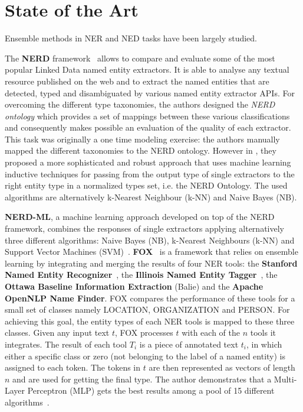 \documentclass{llncs}
\begin{document}

\section{State of the Art}
\label{sec:state-of-art}
Ensemble methods in NER and NED tasks have been largely studied.

The \textbf{NERD} framework~\cite{nerd1,nerd2} allows to compare and evaluate some of the most popular Linked Data named entity extractors.
It is able to analyse any textual resource published on the web and to extract the named entities that are detected, typed and disambiguated by various named entity extractor APIs. For overcoming the different type taxonomies, the authors designed the \textit{NERD ontology} which provides a set of mappings between these various classifications and consequently makes possible an evaluation of the quality of each extractor. This task was originally a one time modeling exercise: the authors manually mapped the different taxonomies to the NERD ontology.
However in \cite{nerd4}, they proposed a more sophisticated and robust approach that uses machine learning inductive techniques for passing from the output type of single extractors to the right entity type in a normalized types set, i.e. the NERD Ontology. The used algorithms are alternatively k-Nearest Neighbour (k-NN) and Naive Bayes (NB).

\textbf{NERD-ML}, a machine learning approach developed on top of the NERD framework, combines the responses of single extractors applying alternatively three different  algorithms: Naive Bayes (NB), k-Nearest Neighbours (k-NN) and Support Vector Machines (SVM)~\cite{nerd2,nerd3}. \textbf{FOX}~\cite{fox1,fox2} is a framework that relies on ensemble learning by integrating and merging the results of four NER tools: the \textbf{Stanford Named Entity Recognizer}~\cite{Finkel:2005:INI:1219840.1219885},
the \textbf{Illinois Named Entity Tagger}~\cite{Ratinov:2009:DCM:1596374.1596399},
the \textbf{Ottawa Baseline Information Extraction} (Balie) and the \textbf{Apache OpenNLP Name Finder}. FOX compares the performance of these tools for a small set of classes namely LOCATION, ORGANIZATION and PERSON. For achieving this goal, the entity types of each NER tools is mapped to these three classes. Given any input text $t$, FOX processes $t$ with each of the $n$ tools it integrates. The result of each tool $T_i$ is a piece of annotated text $t_i$, in which either a specific class or zero (not belonging to the label of a named entity) is assigned to each token. The tokens in $t$ are then represented as vectors of length $n$ and are used for getting the final type. The author demonstrates that a Multi-Layer Perceptron (MLP) gets the best results among a pool of 15 different algorithms~\cite{fox2}.
\end{document}
